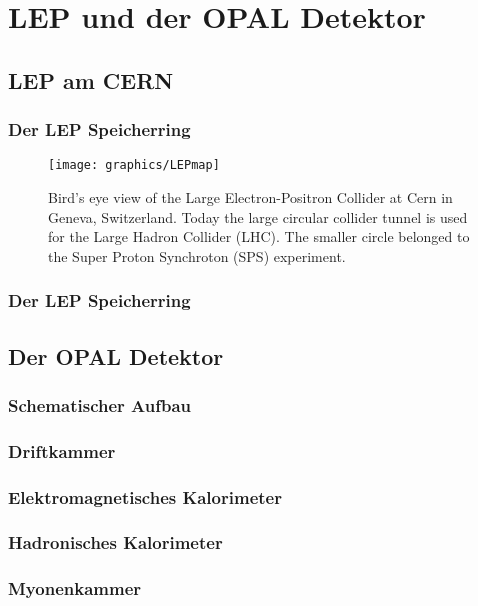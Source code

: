\section{LEP und der OPAL Detektor}
\subsection{LEP am CERN}
\begin{frame}
	\frametitle{Der LEP Speicherring}
	\begin{figure}[ht]
		\centering
		\texttt{[image: graphics/LEPmap]}
		\caption[Bird's eye view LEP]{Bird's eye view of the Large Electron-Positron Collider at Cern in Geneva, Switzerland. Today the large circular collider tunnel is used for the Large Hadron Collider (LHC)\cite{jakobs}. The smaller circle belonged to the Super Proton Synchroton (SPS) experiment.}
		\label{fig:LEPmap}
	\end{figure}
\end{frame}

\begin{frame}
	\frametitle{Der LEP Speicherring}
	
\end{frame}

\subsection{Der OPAL Detektor}
\begin{frame}
	\frametitle{Schematischer Aufbau}
\end{frame}

\begin{frame}
	\frametitle{Driftkammer}
	
\end{frame}
\begin{frame}
	\frametitle{Elektromagnetisches Kalorimeter}
	
\end{frame}

\begin{frame}
	\frametitle{Hadronisches Kalorimeter}
	
\end{frame}

\begin{frame}
	\frametitle{Myonenkammer}
	
\end{frame}


